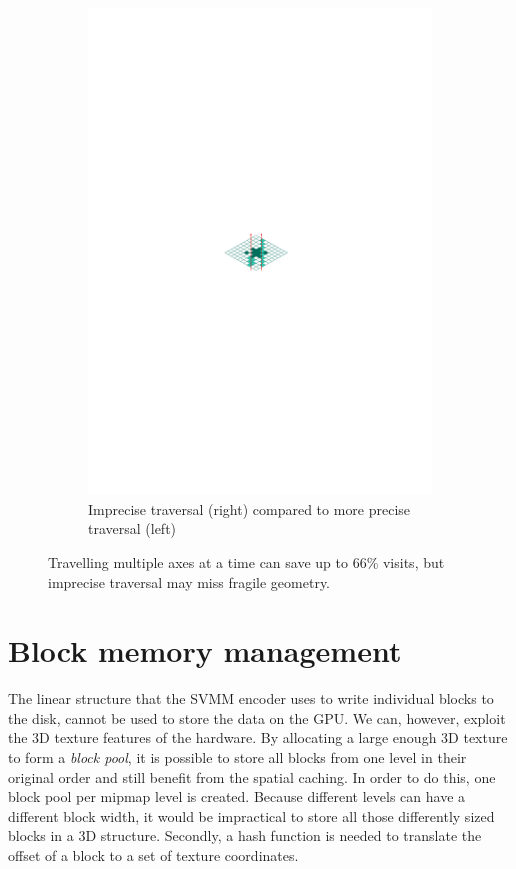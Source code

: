 \begin{figure}
\begin{subfigure}{.33\textwidth}
  \includegraphics[scale=1]{figures/dda_miss-hit.pdf}
  \caption{Imprecise traversal (right) compared to more precise traversal (left)}
  \label{fig:precision3}
\end{subfigure}
\caption{Travelling multiple axes at a time can save up to 66\% visits, but imprecise traversal may miss fragile geometry.}
\label{fig:precision}
\end{figure}
%
\section{Block memory management}
%
The linear structure that the SVMM encoder uses to write individual blocks to the disk, cannot be used to store the data on the GPU. We can, however, exploit the 3D texture features of the hardware. By allocating a large enough 3D texture to form a \emph{block pool}, it is possible to store all blocks from one level in their original order and still benefit from the spatial caching. In order to do this, one block pool per mipmap level is created. Because different levels can have a different block width, it would be impractical to store all those differently sized blocks in a 3D structure. Secondly, a hash function is needed to translate the offset of a block to a set of texture coordinates. 


